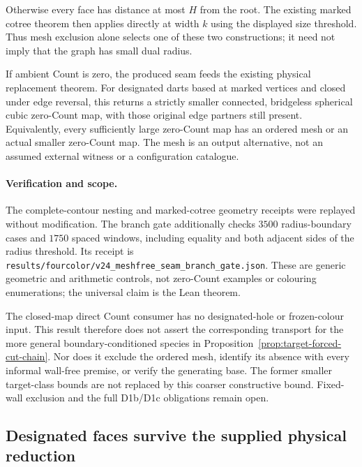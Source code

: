 Otherwise every face has distance at most $H$ from the root. The existing
marked cotree theorem then applies directly at width $k$ using the displayed
size threshold. Thus mesh exclusion alone selects one of these two
constructions; it need not imply that the graph has small dual radius.

If ambient Count is zero, the produced seam feeds the existing physical
replacement theorem. For designated darts based at marked vertices and
closed under edge reversal, this returns a strictly smaller connected,
bridgeless spherical cubic zero-Count map, with those original edge
partners still present.
Equivalently, every sufficiently large zero-Count map has an ordered mesh
or an actual smaller zero-Count map. The mesh is an output alternative,
not an assumed external witness or a configuration catalogue.

\paragraph{Verification and scope.}
The complete-contour nesting and marked-cotree geometry receipts were
replayed without modification. The branch gate additionally checks $3500$
radius-boundary cases and $1750$ spaced windows, including equality and
both adjacent sides of the radius threshold. Its receipt is
\texttt{results/fourcolor/v24\_meshfree\_seam\_branch\_gate.json}.
These are generic geometric and arithmetic controls, not zero-Count
examples or colouring enumerations; the universal claim is the Lean theorem.

The closed-map direct Count consumer has no designated-hole or frozen-colour
input. This result therefore does not assert the corresponding transport
for the more general boundary-conditioned species in
Proposition~\ref{prop:target-forced-cut-chain}. Nor does it exclude the
ordered mesh, identify its absence with every informal wall-free premise,
or verify the generating base. The former smaller target-class bounds are
not replaced by this coarser constructive bound. Fixed-wall exclusion and
the full D1b/D1c obligations remain open.

\subsection{Designated faces survive the supplied physical reduction}
\label{sec:marked-face-reduction}


